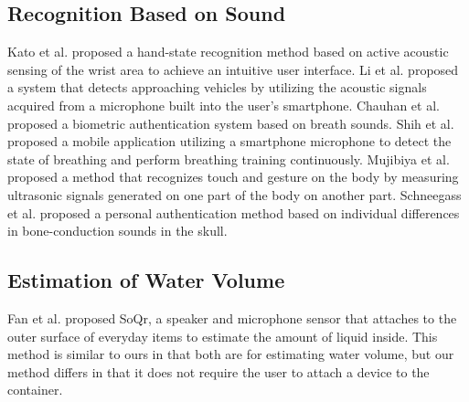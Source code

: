 \documentclass[sigconf]{acmart}
\begin{document}
\subsection{Recognition Based on Sound}
Kato et al.\cite{sound_sensing1} proposed a hand-state recognition method based on active acoustic sensing of the wrist area to achieve an intuitive user interface.
Li et al.\cite{Auto++} proposed a system that detects approaching vehicles by utilizing the acoustic signals acquired from a microphone built into the user's smartphone.
Chauhan et al.\cite{BreathPrint} proposed a biometric authentication system based on breath sounds.
Shih et al.\cite{Breeze} proposed a mobile application utilizing a smartphone microphone to detect the state of breathing and perform breathing training continuously.
Mujibiya et al.\cite{sound_sensing2} proposed a method that recognizes touch and gesture on the body by measuring ultrasonic signals generated on one part of the body on another part.
Schneegass et al.\cite{SkullConduct} proposed a personal authentication method based on individual differences in bone-conduction sounds in the skull.


\subsection{Estimation of Water Volume}
Fan et al.\cite{SoQr} proposed SoQr, a speaker and microphone sensor that attaches to the outer surface of everyday items to estimate the amount of liquid inside.
This method is similar to ours in that both are for estimating water volume, but our method differs in that it does not require the user to attach a device to the container.
\end{document}
